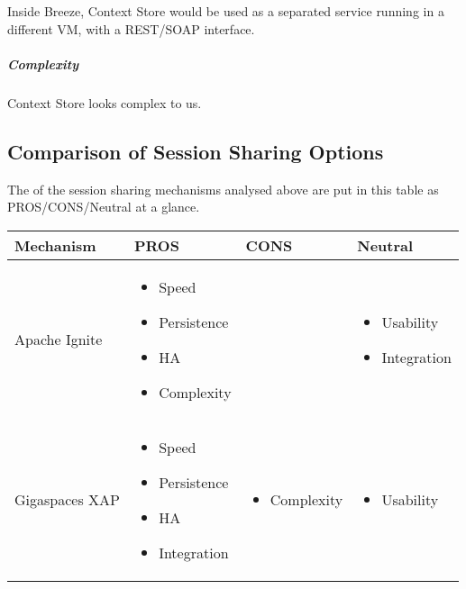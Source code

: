 \documentclass{article}
\begin{document}
	Inside Breeze, Context Store would be used as a separated service running in a different VM, with a REST/SOAP interface.
	
	\subparagraph*{Complexity}

	Context Store looks complex to us.
	
	\subsection{Comparison of Session Sharing Options}
	
	The  of the session sharing mechanisms analysed above are put in this table as PROS/CONS/Neutral at a glance.
	
	\begin{longtable}[l]{ | p{} | p{} | p{} | p{} |}
		\hline
		\textbf{Mechanism} & \textbf{PROS} & \textbf{CONS} & \textbf{Neutral}\\ \hline
		\endhead
		
		Apache Ignite
		&
		\begin{itemize}[label=\Checkmark]
			\item Speed
			\item Persistence
			\item HA
			\item Complexity
		\end{itemize}
		&
		&
		\begin{itemize}[label=\SquareShadowBottomRight]
			\item Usability
			\item Integration
		\end{itemize}
		\\ \hline
		
		Gigaspaces XAP
		&
		\begin{itemize}[label=\Checkmark]
			\item Speed
			\item Persistence
			\item HA
			\item Integration
		\end{itemize}
		&
		\begin{itemize}[label=\XSolidBrush]
			\item Complexity
		\end{itemize}
		&
		\begin{itemize}[label=\SquareShadowBottomRight]
			\item Usability
		\end{itemize}
		\\ \hline
		

\end{longtable}
\end{document}
